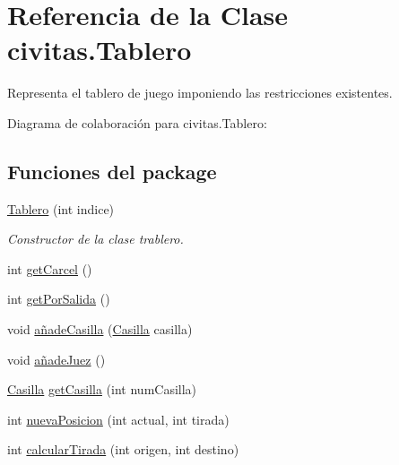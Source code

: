 \hypertarget{classcivitas_1_1Tablero}{}\section{Referencia de la Clase civitas.\+Tablero}
\label{classcivitas_1_1Tablero}


Representa el tablero de juego imponiendo las restricciones existentes.  




Diagrama de colaboración para civitas.\+Tablero\+:
\subsection*{Funciones del \textquotesingle{}package\textquotesingle{}}
\begin{DoxyCompactItemize}
\item 
\hyperlink{classcivitas_1_1Tablero_af249aaa71ddb9e7565ffc2852a26303d}{Tablero} (int indice)
\begin{DoxyCompactList}\small\item\em Constructor de la clase trablero. \end{DoxyCompactList}\item 
int \hyperlink{classcivitas_1_1Tablero_a82417628c739720b0528cd70165fb0c1}{get\+Carcel} ()
\item 
int \hyperlink{classcivitas_1_1Tablero_a9df67a69c40715a9ddee0341fd1aeaff}{get\+Por\+Salida} ()
\item 
void \hyperlink{classcivitas_1_1Tablero_a31d74deef3494a34660c1f397c8c8c5c}{añade\+Casilla} (\hyperlink{classcivitas_1_1Casilla}{Casilla} casilla)
\item 
void \hyperlink{classcivitas_1_1Tablero_aa24e01bfb4a1067c045fd3a31d46b44b}{añade\+Juez} ()
\item 
\hyperlink{classcivitas_1_1Casilla}{Casilla} \hyperlink{classcivitas_1_1Tablero_a3e8d442ecab08ad5735bb82ed191cebb}{get\+Casilla} (int num\+Casilla)
\item 
int \hyperlink{classcivitas_1_1Tablero_a7eb232ed041b08dcbf44ce53ae0acc64}{nueva\+Posicion} (int actual, int tirada)
\item 
int \hyperlink{classcivitas_1_1Tablero_a3951d29981cfc2117153df6908d98ad8}{calcular\+Tirada} (int origen, int destino)
\end{DoxyCompactItemize}
